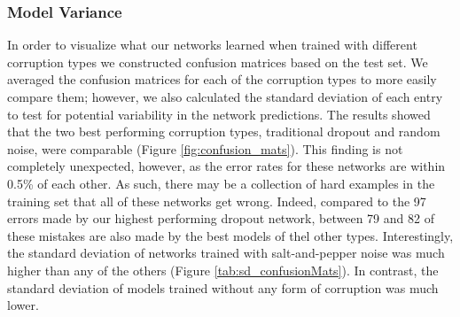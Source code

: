 \documentclass{article} %
\begin{document}
\subsubsection{Model Variance}
In order to visualize what our networks learned when trained with different corruption types we constructed confusion matrices based on the test set. We averaged the confusion matrices for each of the corruption types to more easily compare them; however, we also calculated the standard deviation of each entry to test for potential variability in the network predictions. The results showed that the two best performing corruption types, traditional dropout and random noise, were comparable (Figure \ref{fig:confusion_mats}). This finding is not completely unexpected, however, as the error rates for these networks are within 0.5\% of each other. As such, there may be a collection of hard examples in the training set that all of these networks get wrong. Indeed, compared to the 97 errors made by our highest performing dropout network, between 79 and 82 of these mistakes are also made by the best models of thel other types. Interestingly, the standard deviation of networks trained with salt-and-pepper noise was much higher than any of the others (Figure \ref{tab:sd_confusionMats}). In contrast, the standard deviation of models trained without any form of corruption was much lower.
\end{document}
